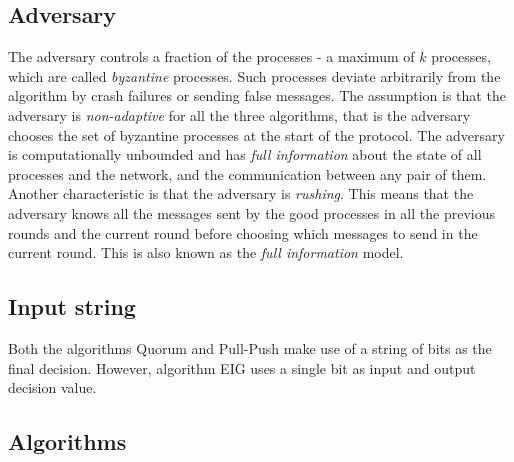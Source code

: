 \subsection{Adversary}
The adversary controls a fraction of the processes - a maximum of $k$ processes, which are called \textit{byzantine} processes. Such processes deviate arbitrarily from the algorithm by crash failures or sending false messages. The assumption is that the adversary is \textit{non-adaptive} for all the three algorithms, that is the adversary chooses the set of byzantine processes at the start of the protocol. The adversary is computationally unbounded and has \textit{full information} about the state of all processes and the network, and the communication between any pair of them. Another characteristic is that the adversary is \textit{rushing}. This means that the adversary knows all the messages sent by the good processes in all the previous rounds and the current round before choosing which messages to send in the current round. This is also known as the \textit{full information} model.

\subsection{Input string}
Both the algorithms Quorum and Pull-Push  make use of a string of bits as the final decision. However, algorithm EIG uses a single bit as input and output decision value.


\subsection{Algorithms}

